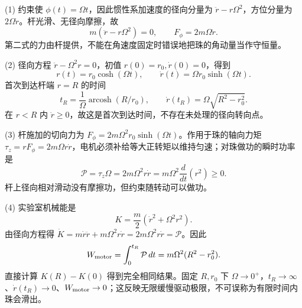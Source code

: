 (1) 约束使 \(\phi(t)=\Omega t\)，因此惯性系加速度的径向分量为 \(\ddot r-r\Omega^2\)，方位分量为 \(2\Omega\dot r\)。杆光滑、无径向摩擦，故
\[
m(\ddot r-r\Omega^2)=0,\qquad F_\phi=2m\Omega\dot r.
\]
第二式的力由杆提供，不能在角速度固定时错误地把珠的角动量当作守恒量。

(2) 径向方程 \(\ddot r-\Omega^2r=0\)，初值 \(r(0)=r_0,\dot r(0)=0\)，得到
\[
r(t)=r_0\cosh(\Omega t),\qquad \dot r(t)=\Omega r_0\sinh(\Omega t).
\]
首次到达杆端 \(r=R\) 的时间
\[
t_R=\frac1\Omega\operatorname{arcosh}(R/r_0),\qquad
\dot r(t_R)=\Omega\sqrt{R^2-r_0^2}.
\]
在 \(r<R\) 内 \(\dot r\ge0\)，故这是首次到达时间，不存在未处理的径向转向点。

(3) 杆施加的切向力为 \(F_\phi=2m\Omega^2r_0\sinh(\Omega t)\)。作用于珠的轴向力矩 \(\tau_z=rF_\phi=2m\Omega r\dot r\)，电机必须补给等大正转矩以维持匀速；对珠做功的瞬时功率是
\[
\mathcal P=\tau_z\Omega=2m\Omega^2r\dot r
=m\Omega^2\frac{d}{dt}(r^2)\ge0.
\]
杆上径向相对滑动没有摩擦功，但约束随转动可以做功。

(4) 实验室机械能是
\[
K=\frac m2(\dot r^2+\Omega^2r^2).
\]
由径向方程得 \(\dot K=m\dot r\ddot r+m\Omega^2r\dot r=2m\Omega^2r\dot r=\mathcal P\)。因此
\[
W_{\rm motor}=\int_0^{t_R}\mathcal P\,dt
=m\Omega^2(R^2-r_0^2).
\]
直接计算 \(K(R)-K(0)\) 得到完全相同结果。固定 \(R,r_0\) 下 \(\Omega\to0^+\)，\(t_R\to\infty\)、\(\dot r(t_R)\to0\)、\(W_{\rm motor}\to0\)；这反映无限缓慢驱动极限，不可误称为有限时间内珠会滑出。
